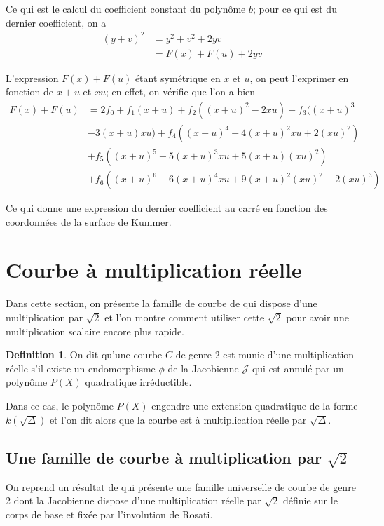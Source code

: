 \documentclass[a4paper]{article}
\theoremstyle{definition}
\newtheorem{definition}{Definition}[section]
\theoremstyle{remark}
\numberwithin{equation}{section}
\begin{document}
Ce qui est le calcul du coefficient constant du polynôme $b$; pour ce qui est du dernier coefficient, on a
\begin{align*}
(y+v)^2 &= y^2 + v^2 + 2yv \\
  &= F(x) + F(u) + 2yv
\end{align*}

L'expression $F(x) + F(u)$ étant symétrique en $x$ et $u$, on peut l'exprimer en fonction de $x+u$ et $xu$; en effet, on vérifie que l'on a bien
\begin{align*}
F(x) + F(u) &= 2f_0 + f_1(x+u)+ f_2((x+u)^2 - 2xu) + f_3((x+u)^3 \\ 
   &- 3(x+u)xu) + f_4((x+u)^4 - 4(x+u)^2xu + 2(xu)^2)   \\
   &+ f_5((x+u)^5 - 5(x+u)^3xu+ 5(x+u)(xu)^2) \\
   &+ f_6((x+u)^6 - 6(x+u)^4xu + 9(x+u)^2(xu)^2 - 2 (xu)^3)
\end{align*}

Ce qui donne une expression du dernier coefficient au carré en fonction des coordonnées de la surface de Kummer.

\section{Courbe à multiplication réelle}

Dans cette section, on présente la famille de courbe de \citet{bending} qui dispose d'une multiplication par $\sqrt{2}$ et l'on montre comment utiliser cette $\sqrt{2}$ pour avoir une multiplication scalaire encore plus rapide.

\begin{definition}
On dit qu'une courbe $C$ de genre 2 est munie d'une multiplication réelle s'il existe un endomorphisme $\phi$ de la Jacobienne $\mathcal{J}$ qui est annulé par un polynôme $P(X)$ quadratique irréductible.

Dans ce cas, le polynôme $P(X)$ engendre une extension quadratique de la forme $k(\sqrt\Delta)$ et l'on dit alors que la courbe est à multiplication réelle par $\sqrt\Delta$.
\end{definition}

\subsection{Une famille de courbe à multiplication par $\sqrt{2}$}

On reprend un résultat de \citet{bending} qui présente une famille universelle de courbe de genre 2 dont la Jacobienne dispose d'une multiplication réelle par $\sqrt2$ définie sur le corps de base et fixée par l'involution de Rosati.
\end{document}
